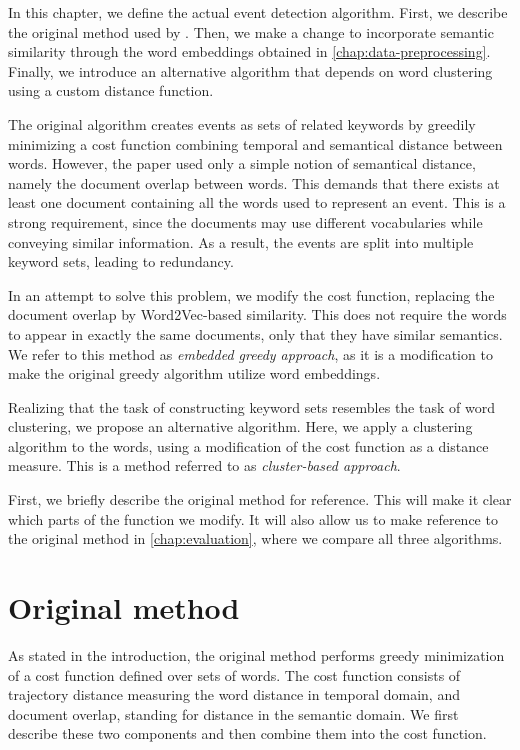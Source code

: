 In this chapter, we define the actual event detection algorithm. First, we describe the original method used by \cite{event-detection}. Then, we make a change to incorporate semantic similarity through the word embeddings obtained in \autoref{chap:data-preprocessing}. Finally, we introduce an alternative algorithm that depends on word clustering using a custom distance function.

The original algorithm creates events as sets of related keywords by greedily minimizing a cost function combining temporal and semantical distance between words. However, the paper used only a simple notion of semantical distance, namely the document overlap between words. This demands that there exists at least one document containing all the words used to represent an event. This is a strong requirement, since the documents may use different vocabularies while conveying similar information.  As a result, the events are split into multiple keyword sets, leading to redundancy.

In an attempt to solve this problem, we modify the cost function, replacing the document overlap by Word2Vec-based similarity. This does not require the words to appear in exactly the same documents, only that they have similar semantics. We refer to this method as \textit{embedded greedy approach}, as it is a modification to make the original greedy algorithm utilize word embeddings.

Realizing that the task of constructing keyword sets resembles the task of word clustering, we propose an alternative algorithm. Here, we apply a clustering algorithm to the words, using a modification of the cost function as a distance measure. This is a method referred to as \textit{cluster-based approach}.

First, we briefly describe the original method for reference. This will make it clear which parts of the function we modify. It will also allow us to make reference to the original method in \autoref{chap:evaluation}, where we compare all three algorithms.

\section{Original method}
As stated in the introduction, the original method performs greedy minimization of a cost function defined over sets of words. The cost function consists of trajectory distance measuring the word distance in temporal domain, and document overlap, standing for distance in the semantic domain. We first describe these two components and then combine them into the cost function.

